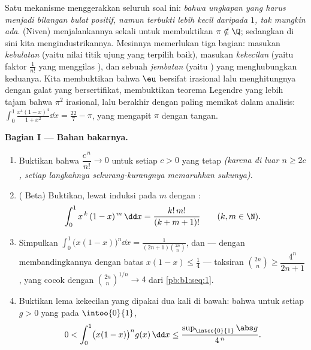 \begin{problem}
\label{pb:b1:integration:1}
Satu mekanisme menggerakkan seluruh soal ini: \emph{bahwa ungkapan yang
harus menjadi bilangan bulat positif, namun terbukti lebih kecil daripada $1$,
tak mungkin ada}.  (Niven) menjalankannya sekali untuk
membuktikan $\pi \notin \Q$; sedangkan di sini kita mengindustrikannya. Mesinnya
memerlukan tiga bagian: masukan \emph{kebulatan} (yaitu nilai titik ujung
 yang terpilih baik), masukan \emph{kekecilan} (yaitu faktor
$\frac{1}{n!}$ yang menggilas ), dan sebuah \emph{jembatan}
(yaitu ) yang menghubungkan keduanya. Kita membuktikan bahwa $\eu$ bersifat
irasional lalu menghitungnya dengan galat yang bersertifikat, membuktikan teorema
Legendre yang lebih tajam bahwa $\pi^2$ irasional, lalu berakhir dengan
 paling memikat dalam analisis: $\int_0^1 \frac{x^4(1 -
x)^4}{1 + x^2}\dd x = \frac{22}{7} - \pi$, yang mengapit $\pi$
dengan tangan.

\medskip
\noindent\textbf{Bagian I --- Bahan bakarnya.}
\begin{enumerate}
  \item Buktikan bahwa $\dfrac{c^{\,n}}{n!} \to 0$ untuk setiap $c
        > 0$ yang tetap \emph{(karena di luar $n \geq 2c$, setiap langkahnya sekurang-kurangnya
        memaruhkan sukunya)}.
  \item ( Beta) Buktikan, lewat induksi pada $m$ dengan
        :
        \[
        \int_0^1 x^{\,k}\,(1 - x)^{\,m}\,\dd x =
        \frac{k!\,m!}{(k + m + 1)!}
        \qquad (k, m \in \N).
        \]
  \item Simpulkan $\displaystyle\int_0^1 \bigl(x(1-x)\bigr)^n \dd x
        = \frac{1}{(2n+1)\binom{2n}{n}}$, dan --- dengan membandingkannya dengan
        batas $x(1 - x) \leq \frac14$ --- taksiran
        $\binom{2n}{n} \geq \dfrac{4^n}{2n+1}$, yang cocok dengan
        $\binom{2n}{n}^{1/n} \to 4$ dari \cref{pb:b1:seq:1}.
  \item Buktikan lema kekecilan yang dipakai dua kali di bawah: bahwa untuk setiap
        $g > 0$ yang  pada $\intoo{0}{1}$,
        \[
        0 < \int_0^1 \bigl(x(1-x)\bigr)^n g(x)\,\dd x
        \leq \frac{\sup_{\intcc{0}{1}}\abs g}{4^{\,n}} .
        \]
\end{enumerate}


\end{problem}
